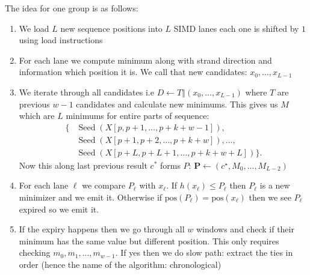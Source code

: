 The idea for one group is as follows:
\begin{enumerate}
  \item We load $L$ new sequence positions into $L$ SIMD lanes each one is shifted by $1$ using load instructions
  \item For each lane we compute minimum along with strand direction and information which position it is. We call that new candidates: $x_0,\ldots,x_{L-1}$
  \item We iterate through all candidates i.e $D\gets T\mathbin\Vert(x_0,\ldots,x_{L-1})$ where $T$ are previous $w-1$ candidates and calculate new minimums. This gives us $M$ which are $L$ minimums for entire parts of sequence:
  \[
    \begin{aligned}
      \{&\operatorname{Seed}(X[p,p+1,\ldots,p+k+w-1]),\\
        &\operatorname{Seed}(X[p+1,p+2,\ldots,p+k+w]),\ldots,\\
        &\operatorname{Seed}(X[p+L,p+L+1,\ldots,p+k+w+L])\}.
    \end{aligned}
  \]
  Now this along last previous result $c^{*}$ forms $P$: $\mathbf P\gets(c^\star,M_0,\ldots,M_{L-2})$
  \item For each lane $\ell$ we compare $P_{\ell}$ with $x_{\ell}$. If $h(x_{\ell}) \leq P_{\ell}$ then $P_{\ell}$ is a new minimizer and we emit it. Otherwise if $\text{pos}(P_{\ell}) = \text{pos}(x_{\ell})$ then we see $P_{\ell}$ expired so we emit it. 
  \item If the expiry happens then we go through all $w$ windows and check if their minimum has the same value but different position. This only requires checking $m_0, m_1, ..., m_{w-1}$. If yes then we do slow path: extract the ties in order (hence the name of the algorithm: chronological)
\end{enumerate}

